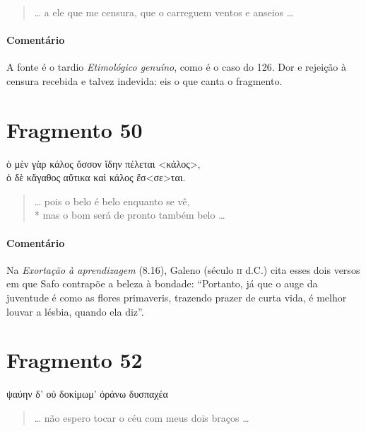 {\begin{verse}
\ldots{} a ele que me censura, que o carreguem ventos
e anseios \ldots{}
\end{verse}

\medskip

{\paragraph{Comentário} A fonte é o tardio \textit{Etimológico genuíno}, como é o caso do 126. Dor e
rejeição à censura recebida e talvez indevida: eis o que canta o fragmento.}


\section{Fragmento 50}

\begin{gkverse}
ὀ μὲν γὰρ κάλος ὄσσον ἴδην πέλεται <κάλος>,\\
ὀ δὲ κἄγαθος αὔτικα καὶ κάλος ἔσ<σε>ται.
\end{gkverse}

\begin{verse}
\ldots{} pois o belo é belo enquanto se vê,\\*
mas o bom será de pronto também belo \ldots{}
\end{verse}

\medskip

{\paragraph{Comentário} Na \textit{Exortação à aprendizagem} (8.16), Galeno (século \textsc{ii} d.C.) cita esses dois versos
em que Safo contrapõe a beleza à bondade: ``Portanto, já que o auge da
juventude é como as flores primaveris, trazendo prazer de curta vida, é melhor
louvar a lésbia, quando ela diz''.}

\pagebreak
\section{Fragmento 52}

\begin{gkverse}
ψαύην δ’ οὐ δοκίμωμ’ ὀράνω \dagger{}δυσπαχέα\dagger{}
\end{gkverse}

\begin{verse}
\ldots{} não espero tocar o céu com meus dois braços \ldots{}
\end{verse}

\medskip

}
